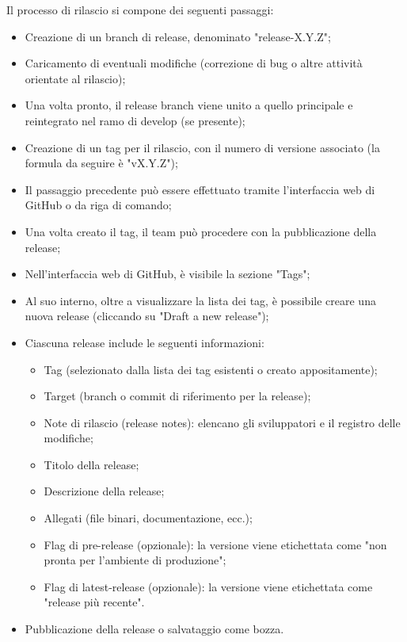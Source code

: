 \vspace{0.5\baselineskip}
\par Il processo di rilascio si compone dei seguenti passaggi:
\begin{itemize}
  \item Creazione di un branch di release, denominato "release-X.Y.Z";
  \item Caricamento di eventuali modifiche (correzione di bug o altre attività orientate al rilascio);
  \item Una volta pronto, il release branch viene unito a quello principale e reintegrato nel ramo di develop (se presente);
  \item Creazione di un tag per il rilascio, con il numero di versione associato (la formula da seguire è "vX.Y.Z");
  \item Il passaggio precedente può essere effettuato tramite l'interfaccia web di GitHub o da riga di comando;
  \item Una volta creato il tag, il team può procedere con la pubblicazione della release;
  \item Nell'interfaccia web di GitHub, è visibile la sezione "Tags"; 
  \item Al suo interno, oltre a visualizzare la lista dei tag, è possibile creare una nuova release (cliccando su "Draft a new release");
  \item Ciascuna release include le seguenti informazioni:
  \begin{itemize}
    \item Tag (selezionato dalla lista dei tag esistenti o creato appositamente);
    \item Target (branch o commit di riferimento per la release);
    \item Note di rilascio (release notes): elencano gli sviluppatori e il registro delle modifiche;
    \item Titolo della release;
    \item Descrizione della release;
    \item Allegati (file binari, documentazione, ecc.);
    \item Flag di pre-release (opzionale): la versione viene etichettata come "non pronta per l'ambiente di produzione";
    \item Flag di latest-release (opzionale): la versione viene etichettata come "release più recente".
  \end{itemize}
  \item Pubblicazione della release o salvataggio come bozza.
\end{itemize}